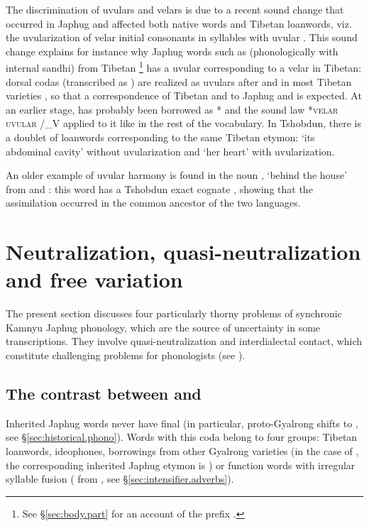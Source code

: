 The discrimination of uvulars and velars is due to a recent sound change that occurred in Japhug and affected both native words and Tibetan loanwords, viz. the uvularization of velar initial consonants in syllables with uvular . This sound change explains for instance why Japhug words such as  (phonologically  with internal sandhi) from Tibetan \footnote{See §\ref{sec:body.part} for an account of the prefix .} has a uvular  corresponding to a velar  in Tibetan: dorsal codas (transcribed as ) are realized as uvulars after  and  in most Tibetan varieties \citep{gong16amdo}, so that a correspondence of Tibetan  and  to Japhug  and  is expected. At an earlier stage,  has probably been borrowed as * and the sound law *\textsc{velar} \fl{} \textsc{uvular} /\_V applied to it like in the rest of the vocabulary. In Tshobdun, there is a doublet of loanwords corresponding to the same Tibetan etymon:    `its abdominal cavity' \citep[413]{jackson19tshobdun} without uvularization and  `her heart' \citep[704]{jackson19tshobdun} with uvularization.

An older example of uvular harmony is found in the noun , `behind the house' from  and : this word has a Tshobdun exact cognate  \citep[172]{jackson19tshobdun}, showing that the assimilation occurred in the common ancestor of the two languages.

\section{Neutralization, quasi-neutralization and free variation}
The present section discusses four particularly thorny problems of synchronic Kamnyu Japhug phonology, which are the source of uncertainty in some transcriptions. They involve quasi-neutralization and interdialectal contact, which constitute challenging problems for phonologists (see \citealt{michaud06neutralisation}). 

\subsection{The contrast between  and } \label{sec:aN.oN.free}
Inherited Japhug words never have final  (in particular, proto-Gyalrong  shifts to , see §\ref{sec:historical.phono}). Words with this coda belong to four groups: Tibetan loanwords, ideophones, borrowings from other Gyalrong varieties (in the case of , the corresponding inherited Japhug etymon is ) or function words with irregular syllable fusion ( from , see §\ref{sec:intensifier.adverbs}).

